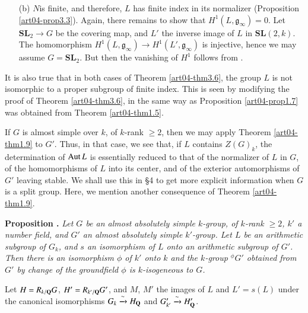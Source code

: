 \begin{itemize}
\item[(b)] $N$\pageoriginale is finite, and therefore, $L$ has finite index in its normalizer (Proposition \ref{art04-prop3.3}). Again, there remains to show that $H^{1}(L,\mathfrak{g}_{\infty})=0$. Let $\mathbf{SL}_{2}\to G$ be the covering map, and $L'$ the inverse image of $L$ in $\mathbf{SL}(2,k)$. The homomorphism $H^{1}(L,\mathfrak{g}_{\infty})\to H^{1}(L',\mathfrak{g}_{\infty})$ is injective, hence we may assume $G=\mathbf{SL}_{2}$. But then the vanishing of $H^{1}$ follows from \cite{art04-key29}.
\end{itemize}

\begin{remark*}
It is also true that in both cases of Theorem \ref{art04-thm3.6}, the group $L$ is not isomorphic to a proper subgroup of finite index. This is seen by modifying the proof of Theorem \ref{art04-thm3.6}, in the same way as Proposition \ref{art04-prop1.7} was obtained from Theorem \ref{art04-thm1.5}.
\end{remark*}

If $G$ is almost simple over $k$, of $k$-rank $\geq 2$, then we may apply Theorem \ref{art04-thm1.9} to $G'$. Thus, in that case, we see that, if $L$ contains $Z(G)_{k}$, the determination of $\operatorname{\mathrm{Aut}} L$ is essentially reduced to that of the normalizer of $L$ in $G$, of the homomorphisms of $L$ into its center, and of the exterior automorphisms of $G'$ leaving stable. We shall use this in \S4 to get more explicit information when $G$ is a split group. Here, we mention another consequence of Theorem \ref{art04-thm1.9}.

\medskip
\noindent
{\bf Proposition .\label{art04-prop3.7}}
{\em Let $G$ be an almost absolutely simple $k$-group, of $k$-rank $\geq 2$, $k'$ a number field, and $G'$ an almost absolutely simple $k'$-group. Let $L$ be an arithmetic subgroup of $G_{k}$, and $s$ an isomorphism of $L$ onto an arithmetic subgroup of $G'$. Then there is an isomorphism $\phi$ of $k'$ onto $k$ and the $k$-group ${}^{\phi}G'$ obtained from $G'$ by change of the groundfield $\phi$ is $k$-isogeneous to $G$.}
\smallskip

Let $H=R_{k/\mathbf{Q}}G$, $H'=R_{k'/\mathbf{Q}}G'$, and $M$, $M'$ the images of $L$ and $L'=s(L)$ under the canonical isomorphisms $G_{k}\xrightarrow{\sim}H_{\mathbf{Q}}$ and $G'_{k'}\xrightarrow{\sim}H'_{\mathbf{Q}}$.

